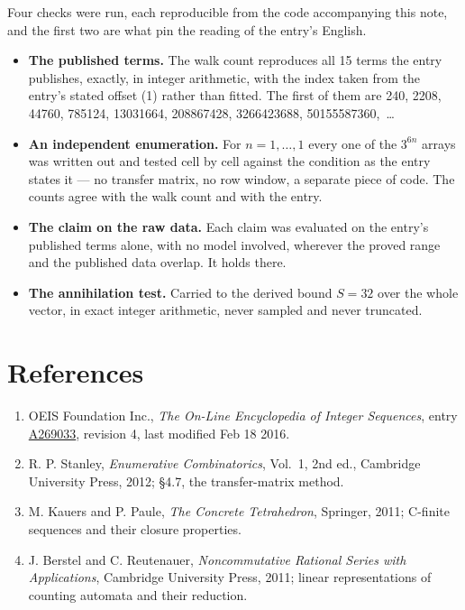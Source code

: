 \documentclass[11pt]{article}
\theoremstyle{definition}
\begin{document}
Four checks were run, each reproducible from the code accompanying this note, and the first two are what pin the reading of the entry's English.

\begin{itemize}

\item {\bfseries The published terms.} The walk count reproduces all 15 terms the entry publishes, exactly, in integer arithmetic, with the index taken from the entry's stated offset (1) rather than fitted. The first of them are 240, 2208, 44760, 785124, 13031664, 208867428, 3266423688, 50155587360,~\dots

\item {\bfseries An independent enumeration.} For $n = 1,\dots,1$ every one of the $3^{6n}$ arrays was written out and tested cell by cell against the condition as the entry states it --- no transfer matrix, no row window, a separate piece of code. The counts agree with the walk count and with the entry.

\item {\bfseries The claim on the raw data.} Each claim was evaluated on the entry's published terms alone, with no model involved, wherever the proved range and the published data overlap. It holds there.

\item {\bfseries The annihilation test.} Carried to the derived bound $S = 32$ over the whole vector, in exact integer arithmetic, never sampled and never truncated.

\end{itemize}

\section{References}

\begin{enumerate}

\item OEIS Foundation Inc., \emph{The On-Line Encyclopedia of Integer Sequences}, entry \href{https://oeis.org/A269033}{A269033}, revision 4, last modified Feb 18 2016.

\item R. P. Stanley, \emph{Enumerative Combinatorics}, Vol.~1, 2nd ed., Cambridge University Press, 2012; \S4.7, the transfer-matrix method.

\item M. Kauers and P. Paule, \emph{The Concrete Tetrahedron}, Springer, 2011; C-finite sequences and their closure properties.

\item J. Berstel and C. Reutenauer, \emph{Noncommutative Rational Series with Applications}, Cambridge University Press, 2011; linear representations of counting automata and their reduction.

\end{enumerate}
\end{document}
